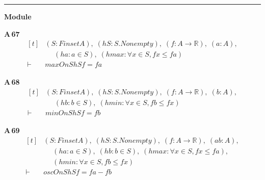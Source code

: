 \vspace{4pt}\noindent\rule{\columnwidth}{0.4pt}\par\vspace{2pt}
\noindent\textbf{Module }\par\vspace{3pt}

\noindent\textbf{A\,67}\quad{}
{\footnotesize\[ \begin{aligned}[t]
&(\mathit{S} : \mathit{Finset} \mathit{A}),\; (\mathit{hS} : \mathit{S}.\mathit{Nonempty}),\; (\mathit{f} : \mathit{A} \to \mathbb{R} ),\; (\mathit{a} : \mathit{A}),\\
&\quad \; (\mathit{ha} : \mathit{a} \in \mathit{S}),\; (\mathit{hmax} : \forall \mathit{x} \in \mathit{S}, \mathit{f} \mathit{x} \leq \mathit{f} \mathit{a})\\
\vdash\;&\mathit{maxOn} \mathit{S} \mathit{hS} \mathit{f} = \mathit{f} \mathit{a}
\end{aligned} \]}

\noindent\textbf{A\,68}\quad{}
{\footnotesize\[ \begin{aligned}[t]
&(\mathit{S} : \mathit{Finset} \mathit{A}),\; (\mathit{hS} : \mathit{S}.\mathit{Nonempty}),\; (\mathit{f} : \mathit{A} \to \mathbb{R} ),\; (\mathit{b} : \mathit{A}),\\
&\quad \; (\mathit{hb} : \mathit{b} \in \mathit{S}),\; (\mathit{hmin} : \forall \mathit{x} \in \mathit{S}, \mathit{f} \mathit{b} \leq \mathit{f} \mathit{x})\\
\vdash\;&\mathit{minOn} \mathit{S} \mathit{hS} \mathit{f} = \mathit{f} \mathit{b}
\end{aligned} \]}

\noindent\textbf{A\,69}\quad{}
{\footnotesize\[ \begin{aligned}[t]
&(\mathit{S} : \mathit{Finset} \mathit{A}),\; (\mathit{hS} : \mathit{S}.\mathit{Nonempty}),\; (\mathit{f} : \mathit{A} \to \mathbb{R} ),\; (\mathit{a} \mathit{b} : \mathit{A}),\\
&\quad \; (\mathit{ha} : \mathit{a} \in \mathit{S}),\; (\mathit{hb} : \mathit{b} \in \mathit{S}),\; (\mathit{hmax} : \forall \mathit{x} \in \mathit{S}, \mathit{f} \mathit{x} \leq \mathit{f} \mathit{a}),\\
&\quad \; (\mathit{hmin} : \forall \mathit{x} \in \mathit{S}, \mathit{f} \mathit{b} \leq \mathit{f} \mathit{x})\\
\vdash\;&\mathit{oscOn} \mathit{S} \mathit{hS} \mathit{f} = \mathit{f} \mathit{a} - \mathit{f} \mathit{b}
\end{aligned} \]}

